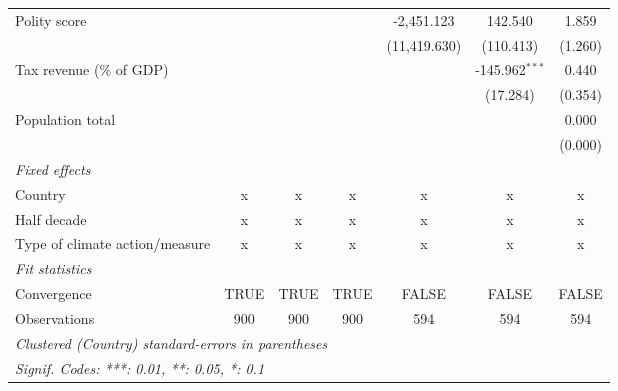 \begin{tabular}{lcccccc}
   Polity score                                                 &                &                &                & -2,451.123     & 142.540          & 1.859\\   
                                                                &                &                &                & (11,419.630)   & (110.413)        & (1.260)\\   
   Tax revenue (\% of GDP)                                      &                &                &                &                & -145.962$^{***}$ & 0.440\\   
                                                                &                &                &                &                & (17.284)         & (0.354)\\   
   Population total                                             &                &                &                &                &                  & 0.000\\   
                                                                &                &                &                &                &                  & (0.000)\\   
   \emph{Fixed effects}\\
   Country                                                      & x              & x              & x              & x              & x                & x\\  
   Half decade                                                  & x              & x              & x              & x              & x                & x\\  
   Type of climate action/measure                               & x              & x              & x              & x              & x                & x\\  
   \midrule \emph{Fit statistics}\\
   Convergence                                                  &TRUE            & TRUE           & TRUE           & FALSE          & FALSE            & FALSE\\  
   Observations                                                 & 900            & 900            & 900            & 594            & 594              & 594\\  
   \midrule
   \multicolumn{7}{l}{\emph{Clustered (Country) standard-errors in parentheses}}\\
   \multicolumn{7}{l}{\emph{Signif. Codes: ***: 0.01, **: 0.05, *: 0.1}}\\
\end{tabular}
\par\endgroup


